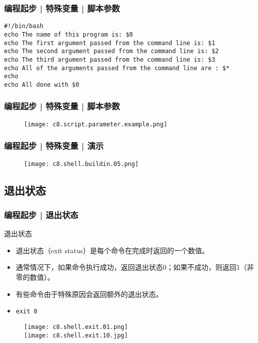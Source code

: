 \begin{frame}[fragile]
  \frametitle{编程起步 | 特殊变量 | \alert{脚本参数}}
\begin{lstlisting}
#!/bin/bash
echo The name of this program is: $0
echo The first argument passed from the command line is: $1
echo The second argument passed from the command line is: $2
echo The third argument passed from the command line is: $3
echo All of the arguments passed from the command line are : $*
echo
echo All done with $0
\end{lstlisting}
\end{frame}

\begin{frame}
  \frametitle{编程起步 | 特殊变量 | 脚本参数}
  \begin{figure}
    \centering
    \texttt{[image: c8.script.parameter.example.png]}
  \end{figure}
\end{frame}

\begin{frame}
  \frametitle{编程起步 | 特殊变量 | \alert{演示}}
  \begin{figure}
    \centering
    \texttt{[image: c8.shell.buildin.05.png]}
  \end{figure}
\end{frame}

\subsection{退出状态}
\begin{frame}[fragile]
  \frametitle{编程起步 | \alert{退出状态}}
  \begin{block}{退出状态}
    \begin{itemize}
      \item 退出状态（exit status）是每个命令在完成时返回的一个数值。
      \item 通常情况下，如果命令执行成功，返回退出状态0；如果不成功，则返回1（非零的数值）。
      \item 有些命令由于特殊原因会返回额外的退出状态。
      \item \verb|exit 0|
    \end{itemize}
  \end{block}
  \vspace{-0.3cm}
  \begin{figure}
    \centering
    \texttt{[image: c8.shell.exit.01.png]}\\
    \texttt{[image: c8.shell.exit.10.jpg]}
  \end{figure}
\end{frame}

